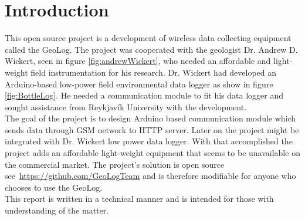 \section*{Introduction}
This open source project is a development of wireless data collecting equipment called the GeoLog. The project was cooperated with the geologist Dr. Andrew D. Wickert\cite{andrewWickert}, seen in figure \ref{fig:andrewWickert}, who needed an affordable and light-weight field instrumentation for his research. Dr. Wickert had developed an Arduino-based\cite{arduinoMega}  low-power field environmental data logger as show in figure \ref{fig:BottleLog}. He needed a communication module to fit his data logger and sought assistance from Reykjavík University with the development.\\
The goal of the project is to design Arduino based communication module which sends data through GSM network to HTTP server. Later on the project might be integrated with Dr. Wickert low power data logger. With that accomplished the project adds an affordable light-weight equipment that seems to be unavailable on the commercial market. The project's solution is open source see~\url{https://github.com/GeoLogTeam} and is therefore modifiable for anyone who chooses to use the GeoLog.\\
This report is written in a technical manner and is intended for those with understanding of the matter.